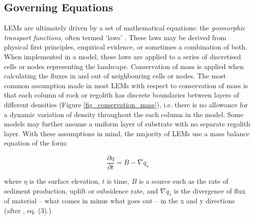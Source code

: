 \subsection{Governing Equations}

LEMs are ultimately driven by a set of mathematical equations: the \textit{geomorphic transport functions}, often termed `laws' \citep{dietrich2003geomorphic,Tucker2010}. These laws may be derived from physical first principles, empirical evidence, or sometimes a combination of both. When implemented in a model, these laws are applied to a series of discretised cells or nodes representing the landscape. Conservation of mass is applied when calculating the fluxes in and out of neighbouring cells or nodes. The most common assumption made in most LEMs with respect to conservation of mass is that each column of rock or regolith has discrete boundaries between layers of different densities (Figure \ref{fig_conservation_mass}), i.e. there is no allowance for a dynamic variation of density throughout the each column in the model. Some models may further assume a uniform layer of substrate with no separate regolith layer. With these assumptions in mind, the majority of LEMs use a mass balance equation of the form:

\begin{equation*}
\frac{{\partial}\eta }{{\partial}t}=B-{\nabla}q_s
\end{equation*}

\noindent
where $\eta $ is the surface elevation, \(t\) is time, \(B\) is a source such as the rate of sediment production, uplift or subsidence rate, and  ${\nabla}q_s$ is the divergence of flux of material – what comes in minus what goes out -- in the x and y directions (after \citet{Tucker2010}, eq. (3).)

